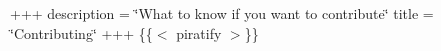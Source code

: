+++ description = \char`\"{}\+What to know if you want to contribute\char`\"{} title = \char`\"{}\+Contributing\char`\"{} +++ \{\{$<$ piratify $>$\}\} 